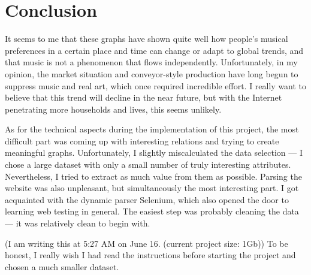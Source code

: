 \documentclass{article}
\begin{document}
\clearpage

\section*{Conclusion}

It seems to me that these graphs have shown quite well how people's musical preferences in a certain place and time can change or adapt to global trends, and that music is not a phenomenon that flows independently. Unfortunately, in my opinion, the market situation and conveyor-style production have long begun to suppress music and real art, which once required incredible effort. I really want to believe that this trend will decline in the near future, but with the Internet penetrating more households and lives, this seems unlikely.

As for the technical aspects during the implementation of this project, the most difficult part was coming up with interesting relations and trying to create meaningful graphs. Unfortunately, I slightly miscalculated the data selection — I chose a large dataset with only a small number of truly interesting attributes. Nevertheless, I tried to extract as much value from them as possible. Parsing the website was also unpleasant, but simultaneously the most interesting part. I got acquainted with the dynamic parser Selenium, which also opened the door to learning web testing in general. The easiest step was probably cleaning the data — it was relatively clean to begin with.

(I am writing this at 5:27 AM on June 16. (current project size: 1Gb)) To be honest, I really wish I had read the instructions before starting the project and chosen a much smaller dataset.
\end{document}
